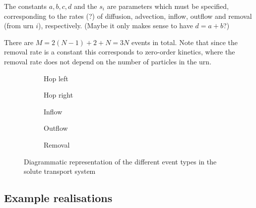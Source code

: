 \documentclass[a4paper,11pt]{article}
\numberwithin{equation}{section}
\begin{document}
The constants \(a,b,c,d\) and the \(s_i\) are parameters which must be
specified, corresponding to the rates (?) of diffusion, advection, inflow,
outflow and removal (from urn \(i\)), respectively. (Maybe it only makes sense to have
\(d=a+b\)?)

There are \(M=2(N-1) + 2 + N = 3N\) events in total. Note that since
the removal rate is a constant this corresponds to zero-order kinetics, where
the removal rate does not depend on the number of particles in the urn.

\begin{figure}[ht!]
    \centering
    \begin{subfigure}[b]{0.3\textwidth}
        \centering
        {
        }
        \caption{Hop left}
    \end{subfigure}
    \qquad\qquad
    \begin{subfigure}[b]{0.3\textwidth}
        \centering
        {
        }
        \caption{Hop right}
    \end{subfigure}

    \begin{subfigure}[b]{0.3\textwidth}
        \centering
        {
        }
        \caption{Inflow}
    \end{subfigure}
    \qquad\qquad
    \begin{subfigure}[b]{0.3\textwidth}
        \centering
        {
        }
        \caption{Outflow}
    \end{subfigure}

    \begin{subfigure}[b]{0.3\textwidth}
        \centering
        {
        }
        \caption{Removal}
    \end{subfigure}
    \caption{\label{fig:transport_events}Diagrammatic representation of the
different event types in the solute transport system}
\end{figure}

\FloatBarrier

\subsection{Example realisations}
\end{document}
